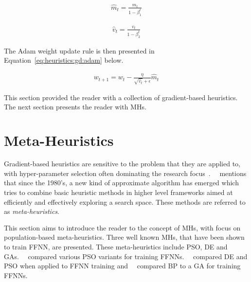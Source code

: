 \begin{equation}
      \label{eq:heuristics:gd:adam_bc_first_moment}
      \begin{split}
            \hat{m}_{t} = \frac{m_{t}}{1 - \beta^{t}_{1}}
      \end{split}
\end{equation}

\begin{equation}
      \label{eq:heuristics:gd:adam_bc_second_moment}
      \begin{split}
            \hat{v}_{t} = \frac{v_{t}}{1 - \beta^{t}_{2}}
      \end{split}
\end{equation}

\noindent
The \acs{Adam} weight update rule is then presented in Equation~\eqref{eq:heuristics:gd:adam} below.

\begin{equation}
      \label{eq:heuristics:gd:adam}
      \begin{split}
            w_{t+1} = w_{t} - \frac{\eta}{\sqrt{\hat{v}_{t}} + \epsilon}\hat{m}_{t}
      \end{split}
\end{equation}

\noindent
This section provided the reader with a collection of gradient-based heuristics. The next section presents the reader with \acp{MH}.

\section{Meta-Heuristics}\label{sec:heuristics:mh}

Gradient-based heuristics are sensitive to the problem that they are applied to, with hyper-parameter selection often dominating the research focus~\cite{ref:bengio:2000, ref:feurer:2019}.~\citeauthor{ref:blum:2003}~\cite{ref:blum:2003} mentions that since the 1980's, a new kind of approximate algorithm has emerged which tries to combine basic heuristic methods in higher level frameworks aimed at efficiently and effectively exploring a search space. These methods are referred to as \textit{meta-heuristics}.

This section aims to introduce the reader to the concept of \acp{MH}, with focus on population-based meta-heuristics. Three well known \acp{MH}, that have been shown to train \acs{FFNN}, are presented. These meta-heuristics include \acf{PSO}, \acf{DE} and \acfp{GA}.~\citeauthor{ref:carvalho:2006}~\cite{ref:carvalho:2006} compared various \acs{PSO} variants for training \acp{FFNN}.~\citeauthor{ref:espinal:2011}~\cite{ref:espinal:2011} compared \acs{DE} and \acs{PSO} when applied to \acs{FFNN} training and~\citeauthor{ref:gupta:1999}~\cite{ref:gupta:1999} compared \acs{BP} to a \acs{GA} for training \acp{FFNN}.

